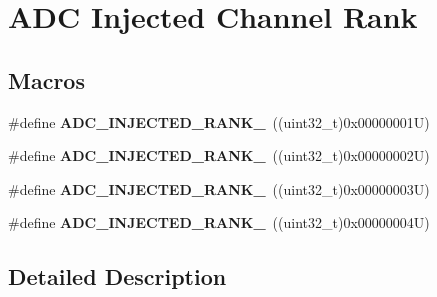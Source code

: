 \hypertarget{group___a_d_c_ex__injected__rank}{}\section{A\+DC Injected Channel Rank}
\label{group___a_d_c_ex__injected__rank}
\subsection*{Macros}
\begin{DoxyCompactItemize}
\item 
\mbox{\label{group___a_d_c_ex__injected__rank_gabe6252325fda6b22c794ea7b0e974ee3}} 
\#define {\bfseries A\+D\+C\+\_\+\+I\+N\+J\+E\+C\+T\+E\+D\+\_\+\+R\+A\+N\+K\+\_}~((uint32\+\_\+t)0x00000001\+U)
\item 
\mbox{\label{group___a_d_c_ex__injected__rank_gaf065faf92e099a1667694233384d187e}} 
\#define {\bfseries A\+D\+C\+\_\+\+I\+N\+J\+E\+C\+T\+E\+D\+\_\+\+R\+A\+N\+K\+\_}~((uint32\+\_\+t)0x00000002\+U)
\item 
\mbox{\label{group___a_d_c_ex__injected__rank_ga5fa8c3014caccae280220fd3df5d7f23}} 
\#define {\bfseries A\+D\+C\+\_\+\+I\+N\+J\+E\+C\+T\+E\+D\+\_\+\+R\+A\+N\+K\+\_}~((uint32\+\_\+t)0x00000003\+U)
\item 
\mbox{\label{group___a_d_c_ex__injected__rank_gaffe7c5042c696b39ef23fba9af5a88b9}} 
\#define {\bfseries A\+D\+C\+\_\+\+I\+N\+J\+E\+C\+T\+E\+D\+\_\+\+R\+A\+N\+K\+\_}~((uint32\+\_\+t)0x00000004\+U)
\end{DoxyCompactItemize}


\subsection{Detailed Description}
